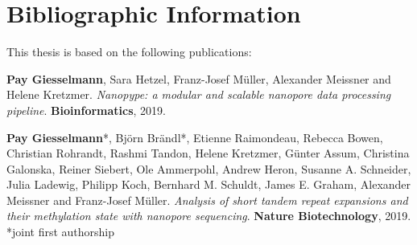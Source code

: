 \chapter*{Bibliographic Information}
\label{sec:bib}
\vspace*{-10mm}


This thesis is based on the following publications:

\textbf{Pay Giesselmann}, Sara Hetzel, Franz-Josef Müller, Alexander Meissner and Helene Kretzmer. \textit{Nanopype: a modular and scalable nanopore data processing pipeline}. \textbf{Bioinformatics}, 2019.


\textbf{Pay Giesselmann}*, Björn Brändl*, Etienne Raimondeau, Rebecca Bowen, Christian Rohrandt, Rashmi Tandon, Helene Kretzmer, Günter Assum, Christina Galonska, Reiner Siebert, Ole Ammerpohl, Andrew Heron, Susanne A. Schneider, Julia Ladewig, Philipp Koch, Bernhard M. Schuldt, James E. Graham, Alexander Meissner and Franz-Josef Müller. \textit{Analysis of short tandem repeat expansions and their methylation state with nanopore sequencing}. \textbf{Nature Biotechnology}, 2019. *joint first authorship






